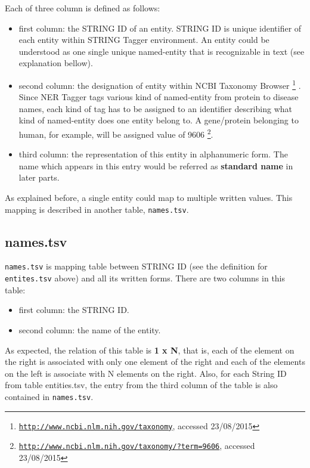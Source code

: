 Each of three column is defined as follows:


\begin{itemize}
\item first column: the STRING ID of an entity. STRING ID is unique identifier of each entity within STRING Tagger environment. An entity could be understood as one single unique named-entity that is recognizable in text (see explanation bellow).
\item second column: the designation of entity within NCBI Taxonomy Browser \footnote{\href{http://www.ncbi.nlm.nih.gov/taxonomy}{\texttt{http://www.ncbi.nlm.nih.gov/taxonomy}}, accessed 23/08/2015} \citep{federhen2012ncbi}. Since NER Tagger tags various kind of named-entity from protein to disease names, each kind of tag has to be assigned to an identifier describing what kind of named-entity does one entity belong to. A gene/protein belonging to human, for example, will be assigned value of 9606 \footnote{\href{http://www.ncbi.nlm.nih.gov/taxonomy/?term=9606}{\texttt{http://www.ncbi.nlm.nih.gov/taxonomy/?term=9606}}, accessed 23/08/2015}.
\item third column: the representation of this entity in alphanumeric form. The name which appears in this entry would be referred as \textbf{standard name} in later parts.
\end{itemize}

As explained before, a single entity could map to multiple written values. This mapping is described in another table, \texttt{names.tsv}.

\subsection{names.tsv}

\texttt{names.tsv} is mapping table between STRING ID (see the definition for \texttt{entites.tsv} above) and all its written forms. There are two columns in this table:

\begin{itemize}
\item first column: the STRING ID.
\item second column: the name of the entity.
\end{itemize}

As expected, the relation of this table is \textbf{1 x N}, that is, each of the element on the right is associated with only one element of the right and each of the elements on the left is associate with N elements on the right. Also, for each String ID from table entities.tsv, the entry from the third column of the table is also contained in \texttt{names.tsv}.

